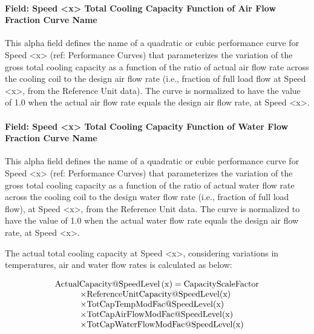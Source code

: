 \paragraph{Field: Speed \textless{}x\textgreater{} Total Cooling Capacity Function of Air Flow Fraction Curve Name}\label{field-speed-x-total-cooling-capacity-function-of-air-flow-fraction-curve-name-1}

This alpha field defines the name of a quadratic or cubic performance curve for Speed \textless{}x\textgreater{} (ref: Performance Curves) that parameterizes the variation of the gross total cooling capacity as a function of the ratio of actual air flow rate across the cooling coil to the design air flow rate (i.e., fraction of full load flow at Speed \textless{}x\textgreater{}, from the Reference Unit data). The curve is normalized to have the value of 1.0 when the actual air flow rate equals the design air flow rate, at Speed \textless{}x\textgreater{}.

\paragraph{Field: Speed \textless{}x\textgreater{} Total Cooling Capacity Function of Water Flow Fraction Curve Name}\label{field-speed-x-total-cooling-capacity-function-of-water-flow-fraction-curve-name}

This alpha field defines the name of a quadratic or cubic performance curve for Speed \textless{}x\textgreater{} (ref: Performance Curves) that parameterizes the variation of the gross total cooling capacity as a function of the ratio of actual water flow rate across the cooling coil to the design water flow rate (i.e., fraction of full load flow), at Speed \textless{}x\textgreater{}, from the Reference Unit data. The curve is normalized to have the value of 1.0 when the actual water flow rate equals the design air flow rate, at Speed \textless{}x\textgreater{}.

The actual total cooling capacity at Speed \textless{}x\textgreater{}, considering variations in temperatures, air and water flow rates is calculated as below:

\begin{equation}
  \begin{array}{l}
    \rm{ActualCapacity} @ \rm{SpeedLevel} \left( x \right) = \rm{CapacityScaleFactor} \\
    \quad \quad \quad \times \rm{ReferenceUnitCapacity} @ \rm{SpeedLevel}(x) \\
    \quad \quad \quad \times \rm{TotCapTempModFac} @ \rm{SpeedLevel}(x) \\
    \quad \quad \quad \times \rm{TotCapAirFlowModFac} @ \rm{SpeedLevel}(x) \\
    \quad \quad \quad \times \rm{TotCapWaterFlowModFac} @ \rm{SpeedLevel}(x)
  \end{array}
\end{equation}

